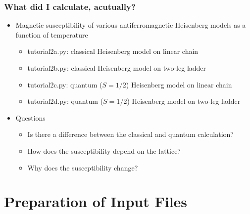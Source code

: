 \begin{frame}[t,fragile]
  \frametitle{What did I calculate, acutually?}
  \begin{itemize}
  \item Magnetic susceptibility of various antiferromagnetic Heisenberg models as a function of temperature
    \begin{itemize}
    \item tutorial2a.py: classical Heisenberg model on linear chain
    \item tutorial2b.py: classical Heisenberg model on two-leg ladder
    \item tutorial2c.py: quantum ($S=1/2$) Heisenberg model on linear chain
    \item tutorial2d.py: quantum ($S=1/2$) Heisenberg model on two-leg ladder
    \end{itemize}
  \item Questions
    \begin{itemize}
      \item Is there a difference between the classical and quantum calculation?
      \item How does the susceptibility depend on the lattice?
      \item Why does the susceptibility change?
    \end{itemize}
  \end{itemize}
\end{frame}

\section{Preparation of Input Files}
\subsection*{\redb\blueb\greenb}

